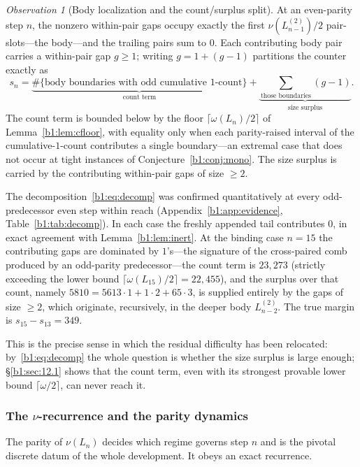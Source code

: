 \documentclass[a4paper]{article}
\theoremstyle{plain}
\theoremstyle{definition}
\theoremstyle{remark}
\newtheorem{observation}{Observation}[subsection]
\begin{document}
\begin{observation}[Body localization and the count/surplus split]\label{b1:obs:decomp}
At an even-parity step $n$, the nonzero within-pair gaps occupy exactly the first $\nu(L^{(2)}_{n-1})/2$ pair-slots---the body---and the trailing pairs sum to $0$. Each contributing body pair carries a within-pair gap $g\ge 1$; writing $g=1+(g-1)$ partitions the counter exactly as
\begin{equation}\label{b1:eq:decomp}
s_n = \underbrace{\#\{\text{body boundaries with odd cumulative $1$-count}\}}_{\text{count term}} + \underbrace{\sum_{\text{those boundaries}}(g-1)}_{\text{size surplus}}.
\end{equation}
The count term is bounded below by the floor $\lceil\omega(L_n)/2\rceil$ of Lemma~\ref{b1:lem:cfloor}, with equality only when each parity-raised interval of the cumulative-$1$-count contributes a single boundary---an extremal case that does not occur at tight instances of Conjecture~\ref{b1:conj:mono}. The size surplus is carried by the contributing within-pair gaps of size $\ge 2$.
\end{observation}

The decomposition~\eqref{b1:eq:decomp} was confirmed quantitatively at every odd-predecessor even step within reach (Appendix~\ref{b1:app:evidence}, Table~\ref{b1:tab:decomp}). In each case the freshly appended tail contributes $0$, in exact agreement with Lemma~\ref{b1:lem:inert}. At the binding case $n=15$ the contributing gaps are dominated by $1$'s---the signature of the cross-paired comb produced by an odd-parity predecessor---the count term is $23{,}273$ (strictly exceeding the lower bound $\lceil\omega(L_{15})/2\rceil=22{,}455$), and the surplus over that count, namely $5810=5613\cdot 1+ 1\cdot 2+ 65\cdot 3$, is supplied entirely by the gaps of size $\ge 2$, which originate, recursively, in the deeper body $L^{(2)}_{n-2}$. The true margin is $s_{15}-s_{13}=349$.

This is the precise sense in which the residual difficulty has been relocated: by~\eqref{b1:eq:decomp} the whole question is whether the size surplus is large enough; \S\ref{b1:sec:12.1} shows that the count term, even with its strongest provable lower bound $\lceil\omega/2\rceil$, can never reach it.

\subsubsection{The $\nu$-recurrence and the parity dynamics}\label{b1:sec:nu}
The parity of $\nu(L_n)$ decides which regime governs step $n$ and is the pivotal discrete datum of the whole development. It obeys an exact recurrence.
\end{document}
